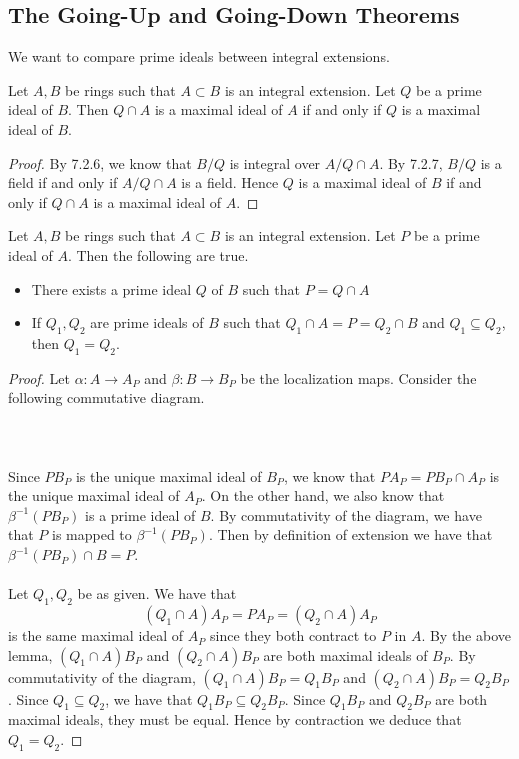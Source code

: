 \documentclass[a4paper]{article}
\begin{document}
\subsection{The Going-Up and Going-Down Theorems}
We want to compare prime ideals between integral extensions. 

\begin{lmm}{}{} Let $A,B$ be rings such that $A\subset B$ is an integral extension. Let $Q$ be a prime ideal of $B$. Then $Q\cap A$ is a maximal ideal of $A$ if and only if $Q$ is a maximal ideal of $B$. \tcbline
\begin{proof}
By 7.2.6, we know that $B/Q$ is integral over $A/Q\cap A$. By 7.2.7, $B/Q$ is a field if and only if $A/Q\cap A$ is a field. Hence $Q$ is a maximal ideal of $B$ if and only if $Q\cap A$ is a maximal ideal of $A$. 
\end{proof}
\end{lmm}

\begin{prp}{}{} Let $A,B$ be rings such that $A\subset B$ is an integral extension. Let $P$ be a prime ideal of $A$. Then the following are true. 
\begin{itemize}
\item There exists a prime ideal $Q$ of $B$ such that $P=Q\cap A$
\item If $Q_1,Q_2$ are prime ideals of $B$ such that $Q_1\cap A=P=Q_2\cap B$ and $Q_1\subseteq Q_2$, then $Q_1=Q_2$. 
\end{itemize} \tcbline
\begin{proof}
Let $\alpha:A\to A_P$ and $\beta:B\to B_P$ be the localization maps. Consider the following commutative diagram. \\~\\
\\~\\
Since $PB_P$ is the unique maximal ideal of $B_P$, we know that $PA_P=PB_P\cap A_P$ is the unique maximal ideal of $A_P$. On the other hand, we also know that $\beta^{-1}(PB_P)$ is a prime ideal of $B$. By commutativity of the diagram, we have that $P$ is mapped to $\beta^{-1}(PB_P)$. Then by definition of extension we have that $\beta^{-1}(PB_P)\cap B=P$. \\~\\

Let $Q_1,Q_2$ be as given. We have that $$(Q_1\cap A)A_P=PA_P=(Q_2\cap A)A_P$$ is the same maximal ideal of $A_P$ since they both contract to $P$ in $A$. By the above lemma, $(Q_1\cap A)B_P$ and $(Q_2\cap A)B_P$ are both maximal ideals of $B_P$. By commutativity of the diagram, $(Q_1\cap A)B_P=Q_1B_P$ and $(Q_2\cap A)B_P=Q_2B_P$. Since $Q_1\subseteq Q_2$, we have that $Q_1B_P\subseteq Q_2B_P$. Since $Q_1B_P$ and $Q_2B_P$ are both maximal ideals, they must be equal. Hence by contraction we deduce that $Q_1=Q_2$. 
\end{proof}
\end{prp}
\end{document}

